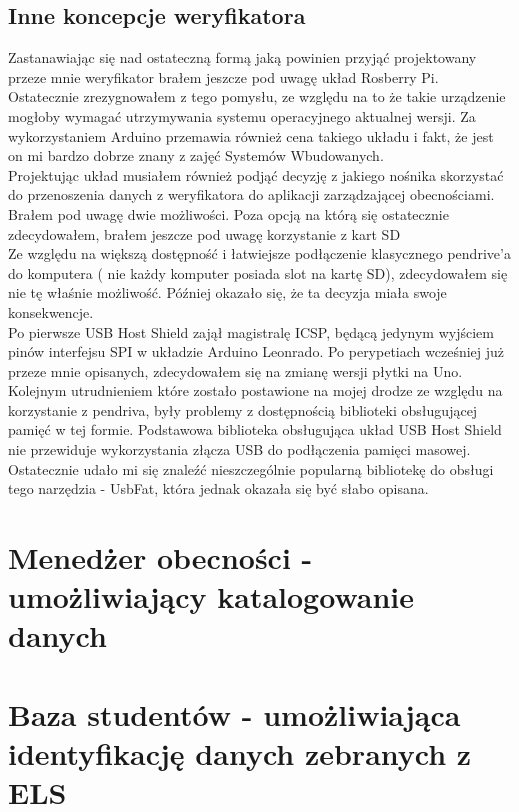 \documentclass[declaration,shortabstract, mgr]{iithesis}
\begin{document}
\subsection{Inne koncepcje weryfikatora}
\indent Zastanawiając się nad ostateczną formą jaką powinien przyjąć projektowany przeze mnie weryfikator brałem jeszcze pod uwagę układ Rosberry Pi. Ostatecznie zrezygnowałem z tego pomysłu, ze względu na to że takie urządzenie mogłoby wymagać utrzymywania systemu operacyjnego aktualnej wersji. Za wykorzystaniem Arduino przemawia również cena takiego układu i fakt, że jest on mi bardzo dobrze znany z zajęć Systemów Wbudowanych.\\
\indent Projektując układ musiałem również podjąć decyzję z jakiego nośnika skorzystać do przenoszenia danych z weryfikatora do aplikacji zarządzającej obecnościami. Brałem pod uwagę dwie możliwości. Poza opcją na którą się ostatecznie zdecydowałem, brałem jeszcze pod uwagę korzystanie z kart SD \\
\indent Ze względu na większą dostępność i łatwiejsze podłączenie klasycznego pendrive'a do komputera ( nie każdy komputer posiada slot na kartę SD), zdecydowałem się nie tę właśnie możliwość. Później okazało się, że ta decyzja miała swoje konsekwencje.\\
\indent Po pierwsze USB Host Shield zajął magistralę ICSP, będącą jedynym wyjściem pinów interfejsu SPI w układzie Arduino Leonrado. Po perypetiach wcześniej już przeze mnie opisanych, zdecydowałem się na zmianę wersji płytki na Uno. \\
\indent Kolejnym utrudnieniem które zostało postawione na mojej drodze ze względu na korzystanie z pendriva, były problemy z dostępnością biblioteki obsługującej pamięć w tej formie. Podstawowa biblioteka obsługująca układ USB Host Shield nie przewiduje wykorzystania złącza USB do podłączenia pamięci masowej. \\
\indent Ostatecznie udało mi się znaleźć nieszczególnie popularną bibliotekę do obsługi tego narzędzia - UsbFat, która jednak okazała się być słabo opisana.
\section{Menedżer obecności - umożliwiający katalogowanie danych}
\section{Baza studentów - umożliwiająca identyfikację danych zebranych z ELS}
\end{document}
